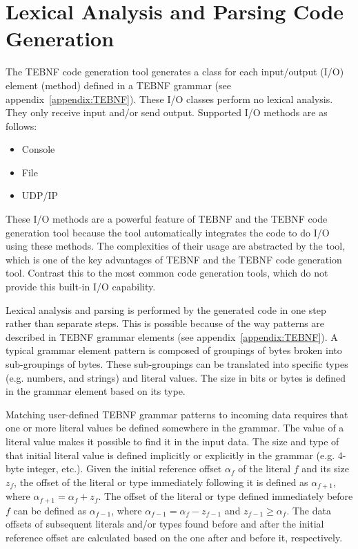 \section{Lexical Analysis and Parsing Code Generation}
The TEBNF code generation tool generates a class for each input/output (I/O) element (method) defined in a TEBNF grammar (see appendix~\ref{appendix:TEBNF}).  These I/O classes perform no lexical analysis.  They only receive input and/or send output.  Supported I/O methods are as follows:
\begin{itemize}
  \item Console
  \item File
  \item UDP/IP
\end{itemize}

\indent
These I/O methods are a powerful feature of TEBNF and the TEBNF code generation tool because the tool automatically integrates the code to do I/O using these methods.  The complexities of their usage are abstracted by the tool, which is one of the key advantages of TEBNF and the TEBNF code generation tool.  Contrast this to the most common code generation tools, which do not provide this built-in I/O capability.

\indent
Lexical analysis and parsing is performed by the generated code in one step rather than separate steps.  This is possible because of the way patterns are described in TEBNF grammar elements (see appendix~\ref{appendix:TEBNF}).  A typical grammar element pattern is composed of groupings of bytes broken into sub-groupings of bytes.  These sub-groupings can be translated into specific types (e.g. numbers, and strings) and literal values.  The size in bits or bytes is defined in the grammar element based on its type.

\indent
Matching user-defined TEBNF grammar patterns to incoming data requires that one or more literal values be defined somewhere in the grammar.  The value of a literal value makes it possible to find it in the input data.  The size and type of that initial literal value is defined implicitly or explicitly in the grammar (e.g. 4-byte integer, etc.).  Given the initial reference offset $ \alpha_f $ of the literal $ f $ and its size $ z_f $, the offset of the literal or type immediately following it is defined as $ \alpha_{f+1} $, where $ \alpha_{f+1} = \alpha_f + z_f $.  The offset of the literal or type defined immediately before $ f $ can be defined as $ \alpha_{f-1} $, where $ \alpha_{f-1} = \alpha_f {-} z_{f-1} $ and $ z_{f-1} \geq \alpha_f $.  The data offsets of subsequent literals and/or types found before and after the initial reference offset are calculated based on the one after and before it, respectively.

